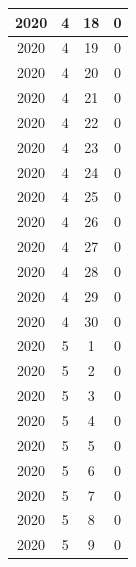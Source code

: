 \begin{longtable} {|c|c|c|c|}
\hline
2020         & 4            & 18           & 0                         \\ 
\hline
2020         & 4            & 19           & 0                         \\ 
\hline
2020         & 4            & 20           & 0                         \\ 
\hline
2020         & 4            & 21           & 0                         \\ 
\hline
2020         & 4            & 22           & 0                         \\ 
\hline
2020         & 4            & 23           & 0                         \\ 
\hline
2020         & 4            & 24           & 0                         \\ 
\hline
2020         & 4            & 25           & 0                         \\ 
\hline
2020         & 4            & 26           & 0                         \\ 
\hline
2020         & 4            & 27           & 0                         \\ 
\hline
2020         & 4            & 28           & 0                         \\ 
\hline
2020         & 4            & 29           & 0                         \\ 
\hline
2020         & 4            & 30           & 0                         \\ 
\hline
2020         & 5            & 1            & 0                         \\ 
\hline
2020         & 5            & 2            & 0                         \\ 
\hline
2020         & 5            & 3            & 0                         \\ 
\hline
2020         & 5            & 4            & 0                         \\ 
\hline
2020         & 5            & 5            & 0                         \\ 
\hline
2020         & 5            & 6            & 0                         \\ 
\hline
2020         & 5            & 7            & 0                         \\ 
\hline
2020         & 5            & 8            & 0                         \\ 
\hline
2020         & 5            & 9            & 0                         \\ 

\end{longtable}
